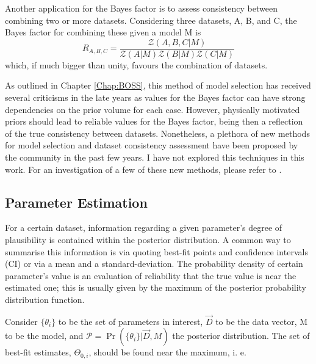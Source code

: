 \qquad Another application for the Bayes factor is to assess consistency between combining two or more datasets. Considering three datasets, A, B, and C, the Bayes factor for combining these given a model M is
\begin{equation}
R_{A,B,C} = \frac{\mathcal{Z}(A,B,C|M)}{\mathcal{Z}(A|M)\mathcal{Z}(B|M)\mathcal{Z}(C|M)}
\label{Eq:Intro:BayesFactor2}
\end{equation}
which, if much bigger than unity, favours the combination of datasets. 

\qquad As outlined in Chapter \ref{Chap:BOSS}, this method of model selection has received several criticisms in the late years as values for the Bayes factor can have strong dependencies on the prior volume for each case. However, physically motivated priors should lead to reliable values for the Bayes factor, being then a reflection of the true consistency between datasets. Nonetheless, a plethora of new methods for model selection and dataset consistency assessment have been proposed by the community in the past few years. I have not explored this techniques in this work. For an investigation of a few of these new methods, please refer to \cite{2017CharnockTension,2018HuTension,2018FeeneyTension}.

\subsection{Parameter Estimation}\label{Sec:ParamEstSampling}
For a certain dataset, information regarding a given parameter's degree of plausibility is contained within the posterior distribution. A common way to summarise this information is via quoting best-fit points and confidence intervals (CI) or via a mean and a standard-deviation. The probability density of certain parameter's value is an evaluation of reliability that the true value is near the estimated one; this is usually given by the maximum of the posterior probability distribution function.

\qquad Consider $\{\theta_i\}$ to be the set of parameters in interest, $\vec{D}$ to be the data vector, M to be the model, and $\mathcal{P} = \Pr(\{\theta_i\}|\vec{D}, M)$ the posterior distribution. The set of best-fit estimates, $\Theta_{0,i}$, should be found near the maximum, i. e.

